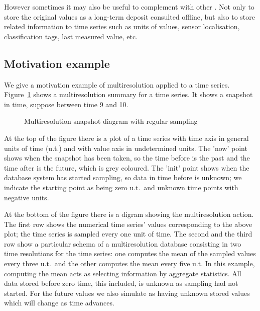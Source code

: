 However sometimes it may also be useful to complement 
with other . Not only to store the original values as a
long-term deposit consulted offline, but also to store related
information to time series such as units of values, sensor
localisation, classification tags, last measured value, etc.



\subsection{Motivation example}
We give a motivation example of multiresolution applied to a time
series.  Figure~\ref{fig:mtsms:sequence} shows a multiresolution
summary for a time series. It shows a snapshot in time, suppose
between time 9 and 10.


\begin{figure}
  \centering
  
  \caption{Multiresolution snapshot diagram with regular sampling}
  \label{fig:mtsms:sequence}
\end{figure}


%   

At the top of the figure there is a plot of a time series with time
axis in general units of time (u.t.) and with value axis in
undetermined units. The 'now' point shows when the snapshot has been
taken, so the time before is the past and the time after is the
future, which is grey coloured. The 'init' point shows when the
database system has started sampling, so data in time before is
unknown; we indicate the starting point as being zero u.t.\ and unknown
time points with negative units.

At the bottom of the figure there is a digram showing the
multiresolution action. The first row shows the numerical time series'
values corresponding to the above plot; the time series is sampled
every one unit of time. The second and the third row show a particular
schema of a multiresolution database consisting in two time
resolutions for the time series: one computes the mean of the sampled
values every three u.t.\ and the other computes the mean every five
u.t. In this example, computing the mean acts as selecting information
by aggregate statistics. All data stored before zero time, this
included, is unknown as sampling had not started. For the future
values we also simulate as having unknown stored values which will
change as time advances.

